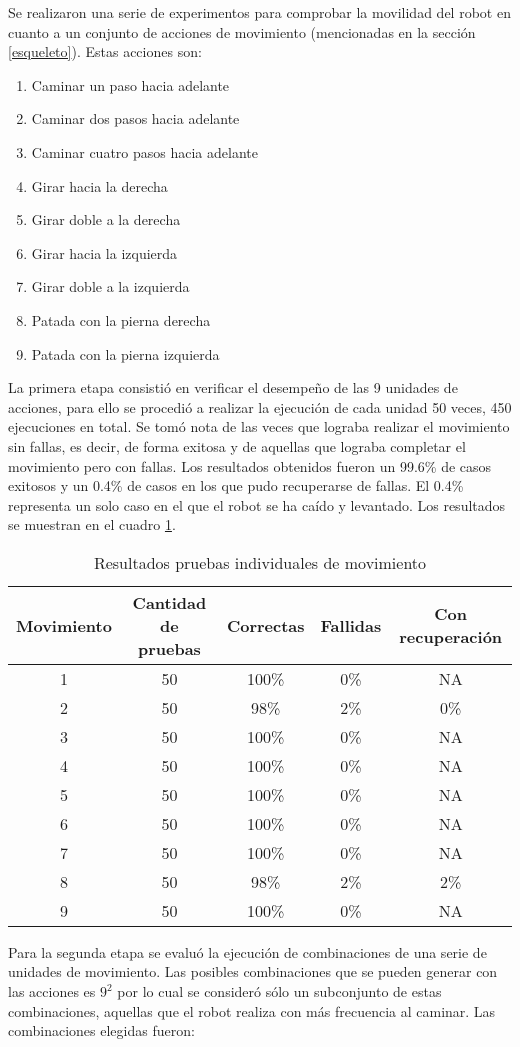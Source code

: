 Se realizaron una serie de experimentos para comprobar la movilidad del robot en cuanto a un conjunto de acciones de movimiento (mencionadas en la sección \ref{esqueleto}). Estas acciones son:
\begin{enumerate}

\setlength{\itemsep}{0.5pt}
\item Caminar un paso hacia adelante 
\item Caminar dos pasos hacia adelante 
\item Caminar cuatro pasos hacia adelante 
\item Girar hacia la derecha 
\item Girar doble a la derecha 
\item Girar hacia la izquierda 
\item Girar doble a la izquierda
\item Patada con la pierna derecha 
\item Patada con la pierna izquierda

\end{enumerate}
La primera etapa consistió en verificar el desempeño de las 9 unidades de acciones, para ello se procedió a realizar la ejecución de cada unidad 50 veces, 450 ejecuciones en total. Se tomó nota de las veces que lograba realizar el movimiento sin fallas, es decir, de forma exitosa y de aquellas que lograba completar el movimiento pero con fallas. Los resultados obtenidos fueron un 99.6\% de casos exitosos y un 0.4\% de casos en los que pudo recuperarse de fallas. El 0.4\% representa un solo caso en el que el robot se ha caído y levantado. Los resultados se muestran en el cuadro \ref{fig:individuales}.  

\begin{table}
\centering
\begin{tabular}{c c c c c}
\hline 
Movimiento & Cantidad de pruebas & Correctas & Fallidas & Con recuperaci\'on \\ 
\hline 
1 & 50 & 100\% & 0\% & NA \\ 
2 & 50 & 98\% & 2\% & 0\% \\ 
3 & 50 &  100\% & 0\% & NA \\ 
4 & 50 &  100\% & 0\% & NA \\ 
5 & 50 &  100\% & 0\% & NA \\ 
6 & 50 &  100\% & 0\% & NA \\ 
7 & 50 &  100\% & 0\% & NA \\ 
8 & 50 &   98\% & 2\% & 2\% \\ 
9 & 50 &  100\% & 0\% & NA \\ 
\hline 
\end{tabular} 
\caption{Resultados pruebas individuales de movimiento}
\label{fig:individuales}
\end{table}
Para la segunda etapa se evalu\'o la ejecuci\'on de combinaciones de una serie de unidades de movimiento. Las posibles combinaciones que se pueden generar con las acciones es $9 ^ 2$ por lo cual se consideró s\'olo un subconjunto de estas combinaciones, aquellas que el robot realiza con más frecuencia al caminar. Las combinaciones elegidas fueron: 

